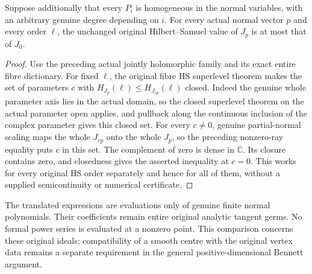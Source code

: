 \begin{theorem}
\label{hir:actual-translated-normal-family-origin-hs-bound}
\leanok
Suppose additionally that every $P_i$ is homogeneous in the normal
variables, with an arbitrary genuine degree depending on $i$.
For every actual normal vector $p$ and every order $\ell$, the unchanged
original Hilbert--Samuel value of $J_p$ is at most that of $J_0$.
\end{theorem}
\begin{proof}
Use the preceding actual jointly holomorphic family and its exact
entire fibre dictionary. For fixed $\ell$, the original fibre HS
superlevel theorem makes the set of parameters $c$ with
$H_{J_p}(\ell)\le H_{J_{cp}}(\ell)$ closed. Indeed the genuine whole
parameter axis lies in the actual domain, so the closed superlevel
theorem on the actual parameter open applies, and pullback along the
continuous inclusion of the complex parameter gives this closed set.
For every $c\ne0$, genuine partial-normal scaling maps the whole
$J_{cp}$ onto the whole $J_p$, so the preceding nonzero-ray equality
puts $c$ in this set. The complement of zero is dense in $\mathbb C$.
Its closure contains zero, and closedness gives the asserted inequality
at $c=0$. This works for every original HS order separately and hence
for all of them, without a supplied semicontinuity or numerical
certificate.
\end{proof}

The translated expressions are evaluations only of genuine finite normal
polynomials. Their coefficients remain entire original analytic tangent
germs. No formal power series is evaluated at a nonzero point. This
comparison concerns these original ideals; compatibility of a smooth
centre with the original vertex data remains a separate requirement in
the general positive-dimensional Bennett argument.
